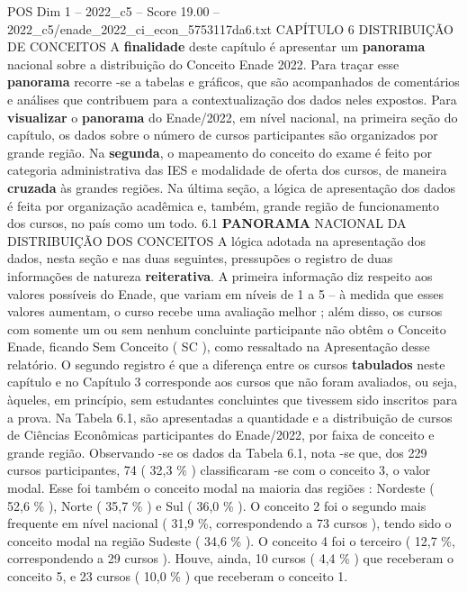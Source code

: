 \begin{textsample}{POS Dim 1 – 2022\_c5 – Score 19.00 – 2022\_c5/enade\_2022\_ci\_econ\_5753117da6.txt}  \label{ex:f1_pos_028}
CAPÍTULO 6 DISTRIBUIÇÃO DE CONCEITOS A \textbf{finalidade} deste capítulo é apresentar um \textbf{panorama} nacional sobre a distribuição do Conceito Enade 2022.
Para traçar esse \textbf{panorama} recorre -se a tabelas e gráficos, que são acompanhados de comentários e análises que contribuem para a contextualização dos dados neles expostos.
Para \textbf{visualizar} o \textbf{panorama} do Enade/2022, em nível nacional, na primeira seção do capítulo, os dados sobre o número de cursos participantes são organizados por grande região.
Na \textbf{segunda}, o mapeamento do conceito do exame é feito por categoria administrativa das IES e modalidade de oferta dos cursos, de maneira \textbf{cruzada} às grandes regiões.
Na última seção, a lógica de apresentação dos dados é feita por organização acadêmica e, também, grande região de funcionamento dos cursos, no país como um todo. 6.1 \textbf{PANORAMA} NACIONAL DA DISTRIBUIÇÃO DOS CONCEITOS A lógica adotada na apresentação dos dados, nesta seção e nas duas seguintes, pressupões o registro de duas informações de natureza \textbf{reiterativa}.
A primeira informação diz respeito aos valores possíveis do Enade, que variam em níveis de 1 a 5 – à medida que esses valores aumentam, o curso recebe uma avaliação melhor ; além disso, os cursos com somente um ou sem nenhum concluinte participante não obtêm o Conceito Enade, ficando Sem Conceito ( SC ), como ressaltado na Apresentação desse relatório.
O segundo registro é que a diferença entre os cursos \textbf{tabulados} neste capítulo e no Capítulo 3 corresponde aos cursos que não foram avaliados, ou seja, àqueles, em princípio, sem estudantes concluintes que tivessem sido inscritos para a prova.
Na Tabela 6.1, são apresentadas a quantidade e a distribuição de cursos de Ciências Econômicas participantes do Enade/2022, por faixa de conceito e grande região.
Observando -se os dados da Tabela 6.1, nota -se que, dos 229 cursos participantes, 74 ( 32,3 \% ) classificaram -se com o conceito 3, o valor modal.
Esse foi também o conceito modal na maioria das regiões : Nordeste ( 52,6 \% ), Norte ( 35,7 \% ) e Sul ( 36,0 \% ).
O conceito 2 foi o segundo mais frequente em nível nacional ( 31,9 \%, correspondendo a 73 cursos ), tendo sido o conceito modal na região Sudeste ( 34,6 \% ).
O conceito 4 foi o terceiro ( 12,7 \%, correspondendo a 29 cursos ).
Houve, ainda, 10 cursos ( 4,4 \% ) que receberam o conceito 5, e 23 cursos ( 10,0 \% ) que receberam o conceito 1.

\end{textsample}
